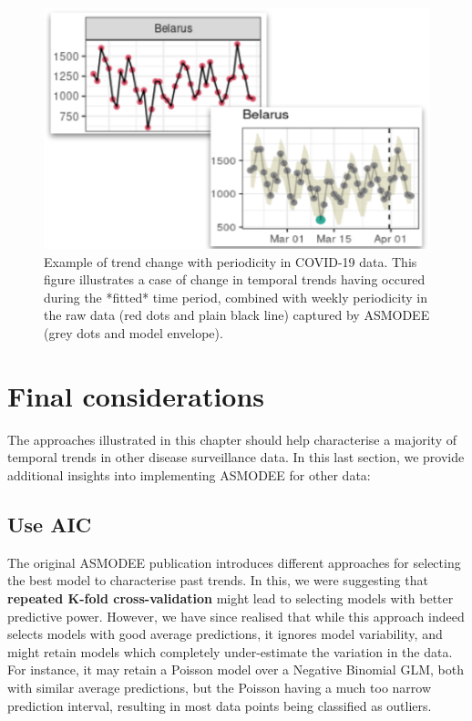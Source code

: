 \documentclass[]{book}
\begin{document}
\begin{figure}

{\centering \includegraphics[width=0.6\linewidth]{images/asmodee_periodic_change} 

}

\caption{Example of trend change with periodicity in COVID-19 data. This figure illustrates a case of change in temporal trends having occured during the *fitted* time period, combined with weekly periodicity in the raw data (red dots and plain black line) captured by ASMODEE (grey dots and model envelope).}\label{fig:asmodee-periodic-change}
\end{figure}

\hypertarget{final-considerations}{%
\section{Final considerations}\label{final-considerations}}

The approaches illustrated in this chapter should help characterise a majority
of temporal trends in other disease surveillance data. In this last section, we
provide additional insights into implementing ASMODEE for other data:

\hypertarget{use-aic}{%
\subsection{Use AIC}\label{use-aic}}

The original ASMODEE publication \citep{Jombart2021-ws} introduces different
approaches for selecting the best model to characterise past trends. In this, we
were suggesting that \textbf{repeated K-fold cross-validation} might lead to
selecting models with better predictive power. However, we have since realised
that while this approach indeed selects models with good average predictions, it
ignores model variability, and might retain models which completely
under-estimate the variation in the data. For instance, it may retain a Poisson
model over a Negative Binomial GLM, both with similar average predictions, but
the Poisson having a much too narrow prediction interval, resulting in most data
points being classified as outliers.
\end{document}
